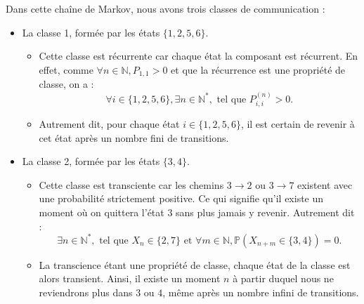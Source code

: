 \documentclass{article}
\begin{document}
\begin{tcolorbox}[colback=white,colframe=yellow!80!black,title=Exemple, breakable]
\begin{center}
\end{center}

Dans cette chaîne de Markov, nous avons trois classes de communication :
\begin{itemize}
    \item La classe 1, formée par les états $\{1, 2, 5, 6\}$.
        \begin{itemize}
            \item Cette classe est récurrente car chaque état la composant est récurrent. En effet, comme $\forall n \in \mathbb{N}, P_{1,1} > 0$ et que la récurrence est une propriété de classe, on a :
                \[
                \forall i \in \{1, 2, 5, 6\}, \exists n \in \mathbb{N}^{*}, \text{ tel que } P_{i,i}^{(n)} > 0.
                \]
            \item Autrement dit, pour chaque état $i \in \{1, 2, 5, 6\}$, il est certain de revenir à cet état après un nombre fini de transitions.
        \end{itemize}
    \item La classe 2, formée par les états $\{3, 4\}$.
        \begin{itemize}
            \item Cette classe est transciente car les chemins $3 \to 2$ ou $3 \to 7$ existent avec une probabilité strictement positive. Ce qui signifie qu'il existe un moment où on quittera l'état $3$ sans plus jamais y revenir. Autrement dit :
                \[
                \exists n \in \mathbb{N}^{*}, \text{ tel que } X_n \in \{2, 7\} \text{ et } \forall m \in \mathbb{N}, \mathbb{P}(X_{n+m} \in \{3, 4\}) = 0.
                \]
            \item La transcience étant une propriété de classe, chaque état de la classe est alors transient. Ainsi, il existe un moment $n$ à partir duquel nous ne reviendrons plus dans $3$ ou $4$, même après un nombre infini de transitions.

\end{itemize}
\end{itemize}
\end{tcolorbox}
\end{document}
